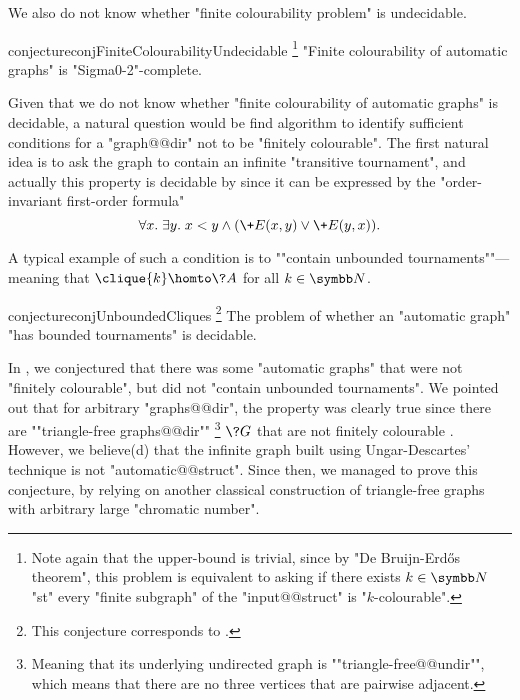 We also do not know whether "finite colourability problem" is undecidable.
\begin{restatable}{conjecture}{conjFiniteColourabilityUndecidable}
	\!\footnote{Note again that the upper-bound is trivial, since by "De Bruijn-Erdős theorem",
	this problem is equivalent to asking if there exists $k\in \N$ "st"
	every "finite subgraph" of the "input@@struct" is "$k$-colourable".}
	\AP\label{conj:finite-colourability-undecidable}
	"Finite colourability of automatic graphs" is "Sigma0-2"-complete.
\end{restatable}

Given that we do not know whether "finite colourability of automatic graphs"
is decidable, a natural question would be find algorithm to identify sufficient conditions
for a "graph@@dir" not to be "finitely colourable".
The first natural idea is to ask the graph to contain an infinite "transitive tournament",
and actually this property is decidable by 
since it can be expressed by the "order-invariant first-order formula"
\[\forall x.\;\exists y.\; x < y \land (\+E(x,y) \lor \+E(y,x)).\]

A typical example of such a condition
is to \AP""contain unbounded tournaments""---meaning that $\clique{k} \homto \?A$ for all $k\in\N$.

\begin{restatable}{conjecture}{conjUnboundedCliques}
	\!\footnote{This conjecture corresponds to \cite[Conjecture 7.3]{BarceloFigueiraMorvan2023SeparatingAutomatic}.}
	\AP\label{conj:unbounded-cliques}
    The problem of whether an "automatic graph" "has bounded tournaments" is decidable.
\end{restatable}

In \cite[Conjecture 7.2]{BarceloFigueiraMorvan2023SeparatingAutomatic}, we conjectured
that there was some "automatic graphs" that were not "finitely colourable",
but did not "contain unbounded tournaments".
We pointed out that for arbitrary "graphs@@dir", the property was clearly true 
since there are \AP""triangle-free graphs@@dir""%
\footnote{Meaning that its underlying undirected graph is \AP""triangle-free@@undir"",
which means that there are no three vertices that are pairwise adjacent.}
$\?G$ that are not finitely colourable \cite{UngarDescartes1954ChromaticGraphs}.
However, we believe(d) that the infinite graph built using Ungar-Descartes' technique
is not "automatic@@struct".
Since then, we managed to prove this conjecture, by relying on another classical construction of
triangle-free graphs with arbitrary large "chromatic number".

